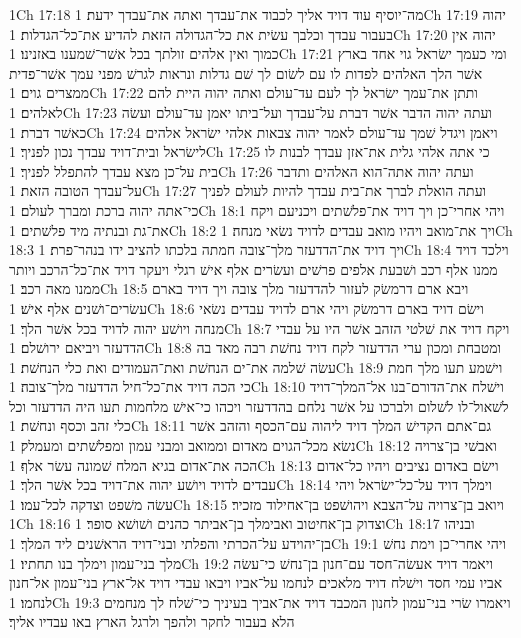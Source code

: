 1Ch 17:18  מה־יוסיף עוד דויד אליך לכבוד את־עבדך ואתה את־עבדך ידעת׃
1Ch 17:19  יהוה בעבור עבדך וכלבך עשׂית את כל־הגדולה הזאת להדיע את־כל־הגדלות׃
1Ch 17:20  יהוה אין כמוך ואין אלהים זולתך בכל אשׁר־שׁמענו באזנינו׃
1Ch 17:21  ומי כעמך ישׂראל גוי אחד בארץ אשׁר הלך האלהים לפדות לו עם לשׂום לך שׁם גדלות ונראות לגרשׁ מפני עמך אשׁר־פדית ממצרים גוים׃
1Ch 17:22  ותתן את־עמך ישׂראל לך לעם עד־עולם ואתה יהוה היית להם לאלהים׃
1Ch 17:23  ועתה יהוה הדבר אשׁר דברת על־עבדך ועל־ביתו יאמן עד־עולם ועשׂה כאשׁר דברת׃
1Ch 17:24  ויאמן ויגדל שׁמך עד־עולם לאמר יהוה צבאות אלהי ישׂראל אלהים לישׂראל ובית־דויד עבדך נכון לפניך׃
1Ch 17:25  כי אתה אלהי גלית את־אזן עבדך לבנות לו בית על־כן מצא עבדך להתפלל לפניך׃
1Ch 17:26  ועתה יהוה אתה־הוא האלהים ותדבר על־עבדך הטובה הזאת׃
1Ch 17:27  ועתה הואלת לברך את־בית עבדך להיות לעולם לפניך כי־אתה יהוה ברכת ומברך לעולם׃
1Ch 18:1  ויהי אחרי־כן ויך דויד את־פלשׁתים ויכניעם ויקח את־גת ובנתיה מיד פלשׁתים׃
1Ch 18:2  ויך את־מואב ויהיו מואב עבדים לדויד נשׂאי מנחה׃
1Ch 18:3  ויך דויד את־הדדעזר מלך־צובה חמתה בלכתו להציב ידו בנהר־פרת׃
1Ch 18:4  וילכד דויד ממנו אלף רכב ושׁבעת אלפים פרשׁים ועשׂרים אלף אישׁ רגלי ויעקר דויד את־כל־הרכב ויותר ממנו מאה רכב׃
1Ch 18:5  ויבא ארם דרמשׂק לעזור להדדעזר מלך צובה ויך דויד בארם עשׂרים־ושׁנים אלף אישׁ׃
1Ch 18:6  וישׂם דויד בארם דרמשׂק ויהי ארם לדויד עבדים נשׂאי מנחה ויושׁע יהוה לדויד בכל אשׁר הלך׃
1Ch 18:7  ויקח דויד את שׁלטי הזהב אשׁר היו על עבדי הדדעזר ויביאם ירושׁלם׃
1Ch 18:8  ומטבחת ומכון ערי הדדעזר לקח דויד נחשׁת רבה מאד בה עשׂה שׁלמה את־ים הנחשׁת ואת־העמודים ואת כלי הנחשׁת׃
1Ch 18:9  וישׁמע תעו מלך חמת כי הכה דויד את־כל־חיל הדדעזר מלך־צובה׃
1Ch 18:10  וישׁלח את־הדורם־בנו אל־המלך־דויד לשׁאול־לו לשׁלום ולברכו על אשׁר נלחם בהדדעזר ויכהו כי־אישׁ מלחמות תעו היה הדדעזר וכל כלי זהב וכסף ונחשׁת׃
1Ch 18:11  גם־אתם הקדישׁ המלך דויד ליהוה עם־הכסף והזהב אשׁר נשׂא מכל־הגוים מאדום וממואב ומבני עמון ומפלשׁתים ומעמלק׃
1Ch 18:12  ואבשׁי בן־צרויה הכה את־אדום בגיא המלח שׁמונה עשׂר אלף׃
1Ch 18:13  וישׂם באדום נציבים ויהיו כל־אדום עבדים לדויד ויושׁע יהוה את־דויד בכל אשׁר הלך׃
1Ch 18:14  וימלך דויד על־כל־ישׂראל ויהי עשׂה משׁפט וצדקה לכל־עמו׃
1Ch 18:15  ויואב בן־צרויה על־הצבא ויהושׁפט בן־אחילוד מזכיר׃
1Ch 18:16  וצדוק בן־אחיטוב ואבימלך בן־אביתר כהנים ושׁושׁא סופר׃
1Ch 18:17  ובניהו בן־יהוידע על־הכרתי והפלתי ובני־דויד הראשׁנים ליד המלך׃
1Ch 19:1  ויהי אחרי־כן וימת נחשׁ מלך בני־עמון וימלך בנו תחתיו׃
1Ch 19:2  ויאמר דויד אעשׂה־חסד עם־חנון בן־נחשׁ כי־עשׂה אביו עמי חסד וישׁלח דויד מלאכים לנחמו על־אביו ויבאו עבדי דויד אל־ארץ בני־עמון אל־חנון לנחמו׃
1Ch 19:3  ויאמרו שׂרי בני־עמון לחנון המכבד דויד את־אביך בעיניך כי־שׁלח לך מנחמים הלא בעבור לחקר ולהפך ולרגל הארץ באו עבדיו אליך׃

